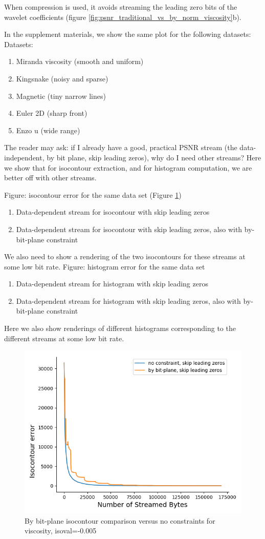 When compression is used, it avoids streaming the leading zero bits of the wavelet coefficients (figure \ref{fig:psnr_traditional_vs_by_norm_viscosity}b).

In the supplement materials, we show the same plot for the following datasets:
Datasets:
\begin{enumerate}
  \item Miranda viscosity (smooth and uniform)
  \item Kingsnake (noisy and sparse)
  \item Magnetic (tiny narrow lines)
  \item Euler 2D (sharp front)
  \item Enzo u (wide range)
\end{enumerate}

The reader may ask: if I already have a good, practical PSNR stream (the data-independent, by bit plane, skip leading zeros), why do I need other streams? Here we show that for isocontour extraction, and for histogram computation, we are better off with other streams.
  
Figure: isocontour error for the same data set (Figure \ref{fig:by_bit_plane_isocontour})
\begin{enumerate}
  \item Data-dependent stream for isocontour with skip leading zeros
  \item Data-dependent stream for isocontour with skip leading zeros, also with by-bit-plane constraint
\end{enumerate}

We also need to show a rendering of the two isocontours for these streams at some low bit rate.
Figure: histogram error for the same data set
\begin{enumerate}
  \item Data-dependent stream for histogram with skip leading zeros
  \item Data-dependent stream for histogram with skip leading zeros, also with by-bit-plane constraint
\end{enumerate}  
  Here we also show renderings of different histograms corresponding to the different streams at some low bit rate.

\begin{figure}
  \centering
  \includegraphics[width=0.8\linewidth]{resources/isocontour-error-by-bit-plane-viscosity.png}
  \caption {By bit-plane isocontour comparison versus no constraints for viscosity, isoval=-0.005}
  \label{fig:by_bit_plane_isocontour}
\end{figure}

